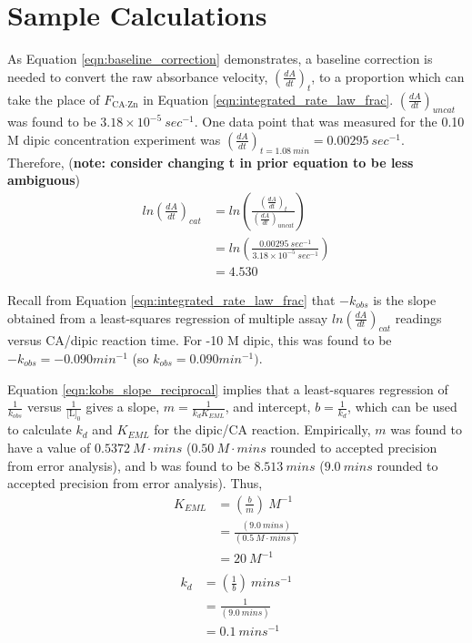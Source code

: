 \section{Sample Calculations}
As Equation \eqref{eqn:baseline_correction} demonstrates, a baseline correction is needed to convert the raw absorbance velocity, $\left(\frac{dA}{dt}\right)_{t}$, to a proportion which can take the place of $F_\text{CA$\cdot$Zn}$ in Equation \eqref{eqn:integrated_rate_law_frac}. $\left(\frac{dA}{dt}\right)_{uncat}$ was found to be $3.18\times10^{-5}\ sec^{-1}$. One data point that was measured for the 0.10 M dipic concentration experiment was $\left(\frac{dA}{dt}\right)_{t=1.08\ min}=0.00295\ sec^{-1}$. Therefore, (\textbf{note: consider changing t in prior equation to be less ambiguous})
\begin{equation*}
\begin{split}
ln \left(\frac{dA}{dt}\right)_{cat}
&= ln \left( \frac{ \left (\frac{dA}{dt}\right)_{t} }{ \left (\frac{dA}{dt}\right)_{uncat} } \right) \\
&= ln \left( \frac{ 0.00295\ sec^{-1} }{ 3.18\times10^{-5}\ sec^{-1} } \right) \\
&= 4.530
\end{split}
\end{equation*}

Recall from Equation \eqref{eqn:integrated_rate_law_frac} that $-k_{obs}$ is the slope obtained from a least-squares regression of multiple assay $ln \left(\frac{dA}{dt}\right)_{cat}$ readings versus CA/dipic reaction time. For -10 M dipic, this was found to be $-k_{obs}=-0.090 min^{-1}$ (so $k_{obs}=0.090 min^{-1})$.

Equation \eqref{eqn:kobs_slope_reciprocal} implies that a least-squares regression of $\frac{1}{k_{obs}}$ versus $\frac{1}{\text{[L]}_0}$ gives a slope, $m=\frac{1}{k_{d}K_{EML}}$, and intercept, $b=\frac{1}{k_{d}}$, which can be used to calculate $k_d$ and $K_{EML}$ for the dipic/CA reaction. Empirically, $m$ was found to have a value of $0.5372\ M\cdot{mins}$ ($0.50\ M\cdot{mins}$ rounded to accepted precision from error analysis), and b was found to be $8.513\ mins$ ($9.0\ mins$ rounded to accepted precision from error analysis). Thus,
\begin{equation}\label{eqn:samp_calc_keml}
\begin{split}
K_{EML}&=\left(\frac{b}{m}\right){\ }M^{-1}\\
&=\frac{\left (9.0{\ }mins\right )}{\left (0.5{\ }M\cdot{mins}\right )}\\
&=20\ M^{-1}\\
\end{split}
\end{equation}
\begin{equation}\label{eqn:samp_calc_kd}
\begin{split}
k_{d}&=\left(\frac{1}{b}\right){\ }mins^{-1}\\
&=\frac{1}{\left (9.0{\ }mins\right )}\\
&=0.1\ mins^{-1}\\
\end{split}
\end{equation}